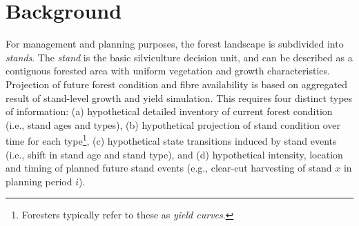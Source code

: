 \section{Background}
\label{sec:background2}




For management and planning purposes, the forest landscape is subdivided into \emph{stands}. 
The \emph{stand} is the basic silviculture decision unit, and can be described as a contiguous forested area with uniform vegetation and growth characteristics. 
Projection of future forest condition and fibre availability is based on aggregated result of stand-level growth and yield simulation. 
This requires four distinct types of information: (a) hypothetical detailed inventory of current forest condition (i.e., stand ages and types), (b) hypothetical projection of stand condition over time for each type\footnote{Foresters typically refer to these as \emph{yield curves}.}, (c) hypothetical state transitions induced by stand events (i.e., shift in stand age and stand type), and (d) hypothetical intensity, location and timing of planned future stand events (e.g., clear-cut harvesting of stand $x$ in planning period $i$). 


